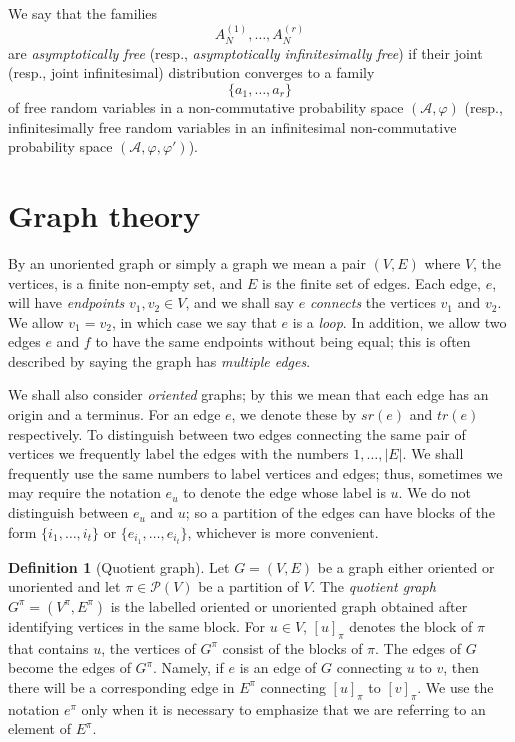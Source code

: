 \documentclass{article}
\theoremstyle{definition}
\newtheorem{definition} [theorem]{Definition}
\newcommand{\cP}{\mathcal{P}}
\begin{document}
{We say that the families
\[
A_N^{(1)},\ldots,A_N^{(r)}
\]
are \emph{asymptotically free} (resp., \emph{asymptotically infinitesimally free})
if their joint (resp., joint infinitesimal) distribution converges to a family
\[
\{a_1,\ldots,a_r\}
\]
of free random variables in a non-commutative probability space
$(\mathcal A,\varphi)$
(resp., infinitesimally free random variables in an infinitesimal
non-commutative probability space
$(\mathcal A,\varphi,\varphi')$).

\section{Graph theory}\label{Section: Graph theory}

By an unoriented graph or simply a graph we mean a pair $(V,E)$ where $V$, the vertices, is a finite non-empty set, and $E$  is the finite set of edges. Each edge, $e$, will have \textit{endpoints} $v_1, v_2 \in V$, and we shall say $e$ \textit{connects} the vertices $v_1$ and $v_2$. We allow $v_1=v_2$, in which case we say that $e$ is a \textit{loop}. In addition, we allow two edges $e$ and $f$ to have the same endpoints without being equal; this is often described by saying the graph has \textit{multiple edges}.

We shall also consider \textit{oriented} graphs; by this we mean that each edge has an origin and a terminus. For an edge $e$, we denote these by $sr(e)$ and $tr(e)$ respectively. To distinguish  between two edges connecting the same pair of vertices we frequently label the edges with the numbers $1,\dots,|E|$. We shall frequently use the same numbers to label vertices and edges; thus, sometimes we may require the notation $e_u$ to denote the edge whose label is $u$. We do not distinguish between $e_u$ and $u$; so a partition of the edges can have blocks of the form $\{i_1,\dots,i_t\}$ or $\{e_{i_1},\dots,e_{i_t}\}$, whichever is more convenient.

\begin{definition}[Quotient graph]\label{Definition: Quotient graph}
Let $G=(V,E)$ be a graph either oriented  or unoriented and let $\pi\in \cP(V)$ be a partition of $V$. The \textit{quotient graph} $G^{\pi}=(V^{\pi},E^{\pi})$ is the labelled oriented or unoriented graph obtained after identifying vertices in the same block. For $u\in V$, $[u]_{\pi}$ denotes the block of $\pi$ that contains $u$, the vertices of $G^{\pi}$ consist of the blocks of $\pi$. The edges of $G$ become the edges of $G^\pi$. Namely, if $e$ is an edge of $G$ connecting $u$ to $v$, then there will be a corresponding edge in $E^\pi$ connecting $[u]_{\pi}$ to $[v]_{\pi}$. We use the notation $e^\pi$ only when it is necessary to emphasize that we are referring to an element of $E^\pi$. 


\end{definition}}
\end{document}
